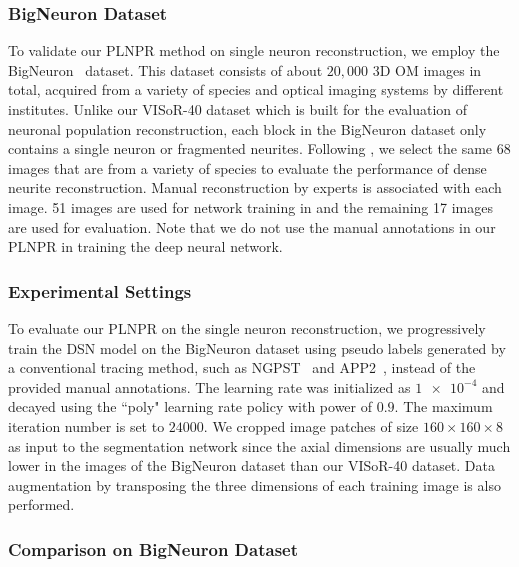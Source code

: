 \subsubsection{BigNeuron Dataset}

To validate our PLNPR method on single neuron reconstruction, we employ the BigNeuron~\cite{peng2015} dataset.
This dataset consists of about $20,000$ 3D OM images in total, acquired from a variety of species and optical imaging systems by different institutes.
Unlike our VISoR-40 dataset which is built for the evaluation of neuronal population reconstruction, each block in the BigNeuron dataset only contains a single neuron or fragmented neurites.
Following \cite{Li2017}, we select the same 68 images that are from a variety of species to evaluate the performance of dense neurite reconstruction.
Manual reconstruction by experts is associated with each image. 
51 images are used for network training in \cite{Li2017} and the remaining 17 images are used for evaluation.
Note that we do not use the manual annotations in our PLNPR in training the deep neural network. 


\subsubsection{Experimental Settings}
 
 
To evaluate our PLNPR on the single neuron reconstruction, we progressively train the DSN model on the BigNeuron dataset using pseudo labels generated by a conventional tracing method, such as NGPST~\cite{Quan2015} and APP2~\cite{Xiao2013}, instead of the provided manual annotations.
%
The learning rate was initialized as $\num{1e-4}$ and decayed using the ``poly" learning rate policy with power of $0.9$. The maximum iteration number is set to $ 24000 $. 
We cropped image patches of size $160\times 160\times 8$ as input to the segmentation network since the axial dimensions are usually much lower in the images of the BigNeuron dataset than our VISoR-40 dataset.
Data augmentation by transposing the three dimensions of each training image is also performed. 


\subsubsection{Comparison on BigNeuron Dataset}

